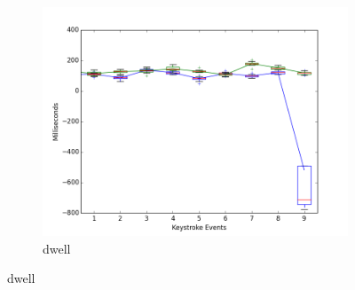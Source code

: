 \documentclass{article}
\begin{document}
\begin{figure}[H]
  \begin{subfigure}[b]{0.3\textwidth}
    \includegraphics[width=\textwidth]{biedenharn_jordan_dwell_final.png}
    \caption{dwell}
    \label{all_graphs:dwell}
  \end{subfigure}


\end{figure}
\end{document}
